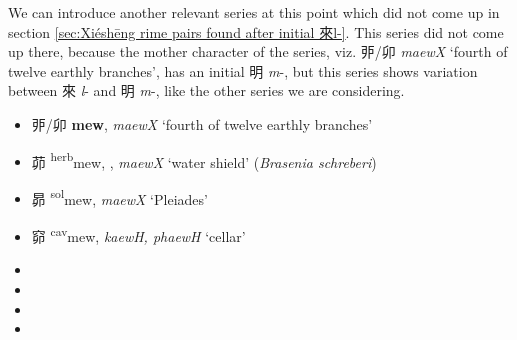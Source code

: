 We can introduce another relevant series at this point which did not come up in   section \ref{sec:Xiéshēng rime pairs found after initial 來l-}.
This series did not come up there, because the mother character of the series, viz. 
戼/卯 \textit{maewX} `fourth of twelve earthly branches', has an initial 明 \textit{m}-, but this series shows variation between 來 \textit{l}- and 明 \textit{m}-, like the other series we are considering.  

\begin{itemize}
  \item {\Large{戼}}/{\Large{卯}} %
    {\large{\textbf{mew}}},
    \textit{maewX} `fourth of twelve earthly branches' %

  \item {\Large{茆}} %
    {\large{{\textsuperscript{herb}}mew}},
    {}, \textit{maewX} `water shield' (\textit{Brasenia schreberi}) %

  \item {\Large{昴}} %
    {\large{{\textsuperscript{sol}}mew}},
    \textit{maewX} `Pleiades' %

  \item {\Large{窌}} %
    {\large{{\textsuperscript{cav}}mew}},
    \textit{kaewH, phaewH} `cellar' %

  
  \item {} %

\item {} {\color{gray}{`trade'}} %

  \item {} %


  \item {} %

\vspace{-3mm}


\begin{itemize}[noitemsep]

\end{itemize}
\end{itemize}
